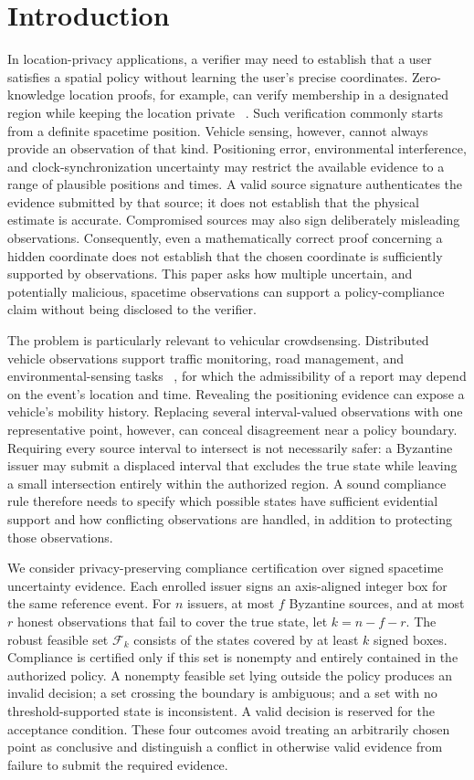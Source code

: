 \documentclass[pdflatex,iicol,sn-mathphys-num]{sn-jnl}
\theoremstyle{thmstyleone}
\begin{document}
\section{Introduction}
In location-privacy applications, a verifier may need to establish that a user satisfies a spatial policy without learning the user's precise coordinates. Zero-knowledge location proofs, for example, can verify membership in a designated region while keeping the location private ~\citep{ZKLP,VehiclePolicy}. Such verification commonly starts from a definite spacetime position. Vehicle sensing, however, cannot always provide an observation of that kind. Positioning error, environmental interference, and clock-synchronization uncertainty may restrict the available evidence to a range of plausible positions and times. A valid source signature authenticates the evidence submitted by that source; it does not establish that the physical estimate is accurate. Compromised sources may also sign deliberately misleading observations. Consequently, even a mathematically correct proof concerning a hidden coordinate does not establish that the chosen coordinate is sufficiently supported by observations. This paper asks how multiple uncertain, and potentially malicious, spacetime observations can support a policy-compliance claim without being disclosed to the verifier.

The problem is particularly relevant to vehicular crowdsensing. Distributed vehicle observations support traffic monitoring, road management, and environmental-sensing tasks ~\citep{Suhag2023,Zheng2025BARM}, for which the admissibility of a report may depend on the event's location and time. Revealing the positioning evidence can expose a vehicle's mobility history. Replacing several interval-valued observations with one representative point, however, can conceal disagreement near a policy boundary. Requiring every source interval to intersect is not necessarily safer: a Byzantine issuer may submit a displaced interval that excludes the true state while leaving a small intersection entirely within the authorized region. A sound compliance rule therefore needs to specify which possible states have sufficient evidential support and how conflicting observations are handled, in addition to protecting those observations.

We consider privacy-preserving compliance certification over signed spacetime uncertainty evidence. Each enrolled issuer signs an axis-aligned integer box for the same reference event. For $n$ issuers, at most $f$ Byzantine sources, and at most $r$ honest observations that fail to cover the true state, let $k = n - f - r$. The robust feasible set $\mathcal{F}_k$ consists of the states covered by at least $k$ signed boxes. Compliance is certified only if this set is nonempty and entirely contained in the authorized policy. A nonempty feasible set lying outside the policy produces an invalid decision; a set crossing the boundary is ambiguous; and a set with no threshold-supported state is inconsistent. A valid decision is reserved for the acceptance condition. These four outcomes avoid treating an arbitrarily chosen point as conclusive and distinguish a conflict in otherwise valid evidence from failure to submit the required evidence.
\end{document}
